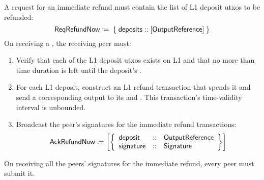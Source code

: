 \documentclass[../hydrozoa.tex]{subfiles}
\begin{document}
A request for an immediate refund must contain the list of L1 deposit utxos to be refunded:
\begin{equation*}
  \mathsf{ReqRefundNow} \coloneq \;\{\; \mathsf{deposits} :: [\mathsf{OutputReference}] \;\}
\end{equation*}
On receiving a , the receiving peer must:
\begin{enumerate}
  \item Verify that each of the L1 deposit utxos exists on L1 and that no more than  time duration is left until the deposit's .
  \item For each L1 deposit, construct an L1 refund transaction that spends it and send a corresponding output to its  and .
    This transaction's time-validity interval is unbounded.
  \item Broadcast the peer's signatures for the immediate refund transactions:
    \begin{equation*}
      \mathsf{AckRefundNow} \coloneq \left[\left\{
      \begin{array}{lll}
        \mathsf{deposit} &::& \mathsf{OutputReference} \\
        \mathsf{signature} &::& \mathsf{Signature}
      \end{array}\right\}\right]
    \end{equation*}
\end{enumerate}
On receiving all the peers' signatures for the immediate refund, every peer must submit it.
\end{document}
